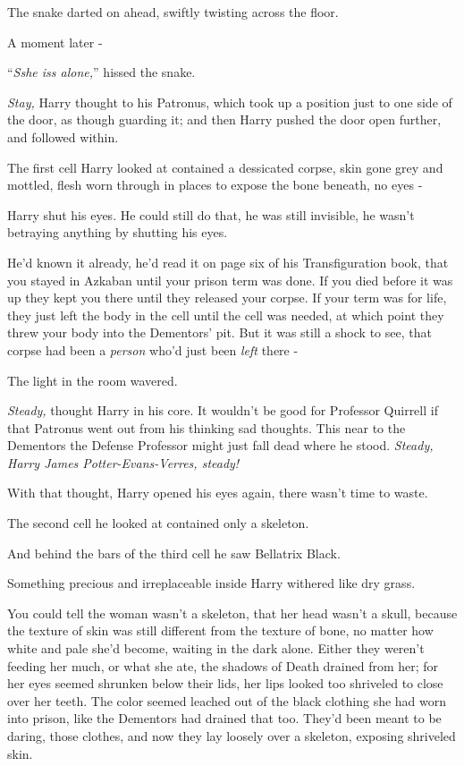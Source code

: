 The snake darted on ahead, swiftly twisting across the floor.

A moment later -

``\emph{Sshe iss alone,}'' hissed the snake.

\emph{Stay,} Harry thought to his Patronus, which took up a position just to one side of the door, as though guarding it; and then Harry pushed the door open further, and followed within.

The first cell Harry looked at contained a dessicated corpse, skin gone grey and mottled, flesh worn through in places to expose the bone beneath, no eyes -

Harry shut his eyes. He could still do that, he was still invisible, he wasn't betraying anything by shutting his eyes.

He'd known it already, he'd read it on page six of his Transfiguration book, that you stayed in Azkaban until your prison term was done. If you died before it was up they kept you there until they released your corpse. If your term was for life, they just left the body in the cell until the cell was needed, at which point they threw your body into the Dementors' pit. But it was still a shock to see, that corpse had been a \emph{person} who'd just been \emph{left} there -

The light in the room wavered.

\emph{Steady,} thought Harry in his core. It wouldn't be good for Professor Quirrell if that Patronus went out from his thinking sad thoughts. This near to the Dementors the Defense Professor might just fall dead where he stood. \emph{Steady, Harry James Potter-Evans-Verres, steady!}

With that thought, Harry opened his eyes again, there wasn't time to waste.

The second cell he looked at contained only a skeleton.

And behind the bars of the third cell he saw Bellatrix Black.

Something precious and irreplaceable inside Harry withered like dry grass.

You could tell the woman wasn't a skeleton, that her head wasn't a skull, because the texture of skin was still different from the texture of bone, no matter how white and pale she'd become, waiting in the dark alone. Either they weren't feeding her much, or what she ate, the shadows of Death drained from her; for her eyes seemed shrunken below their lids, her lips looked too shriveled to close over her teeth. The color seemed leached out of the black clothing she had worn into prison, like the Dementors had drained that too. They'd been meant to be daring, those clothes, and now they lay loosely over a skeleton, exposing shriveled skin.

